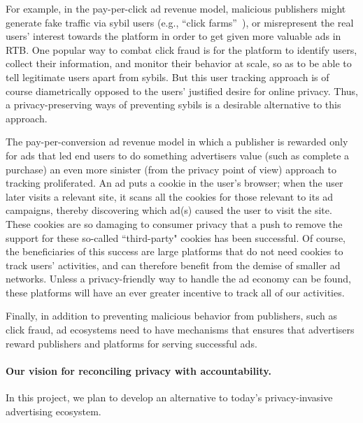 %
%
%
For example, in the pay-per-click ad revenue model, malicious publishers might generate fake traffic via sybil users (e.g., ``click
farms''~\cite{understanding-ad-fraud}), or misrepresent the real users' interest
towards the platform in order to get given more valuable ads in RTB.  One popular way to combat click fraud is for the platform to identify users,
collect their information, and monitor their behavior at scale, so as to be able to tell legitimate users apart from sybils.
%
But this user tracking approach is
of course diametrically opposed to the users' justified desire for online
privacy.
%
Thus, a privacy-preserving ways of preventing sybils is a desirable alternative to this approach.

The pay-per-conversion ad revenue model in which a publisher is rewarded only for ads that led end users to do something advertisers value (such as complete a purchase) an even more sinister (from the privacy point of view) approach to tracking proliferated.  
%
An ad puts a cookie in the user's browser; when the user later visits a relevant site, it scans all the cookies for those relevant to its ad campaigns, thereby discovering which ad(s) caused the user to visit the site.
%
These cookies are so damaging to consumer privacy that a push to remove the support for these so-called ``third-party" cookies has been successful.
%
Of course, the beneficiaries of this success are large platforms that do not need cookies to track users' activities, and can therefore benefit from the demise of smaller ad networks.
%
Unless a privacy-friendly way to handle the ad economy can be found, these platforms will have an ever greater incentive to track all of our activities.

Finally, in addition to preventing malicious behavior from publishers, such as click fraud, ad ecosystems need to have mechanisms that ensures that advertisers reward publishers and platforms for serving successful ads.  

\paragraph{Our vision for reconciling privacy with accountability.}
%
In this project, we plan to develop an alternative to today's privacy-invasive
advertising ecosystem.
%


